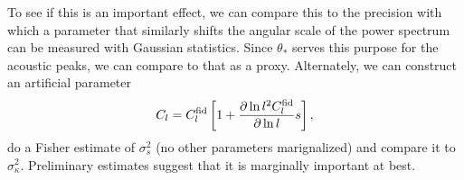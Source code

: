 \documentclass[11pt]{article}
\begin{document}
To see if this is an important effect, we can compare this to the precision with which a parameter
that similarly shifts the angular scale of the power spectrum can be measured with Gaussian statistics.   Since $\theta_*$ serves this purpose for the acoustic peaks, we can compare to that as a proxy.   Alternately, we 
can construct an artificial parameter 
\begin{equation}
C_l = C_l^{\rm fid} \left[ 1+ \frac{\partial \ln l^2 C_l^{\rm fid} }{\partial \ln l} s \right],
\end{equation}
do a Fisher estimate of $\sigma_s^2$ (no other parameters marignalized) and compare it to $\sigma_\kappa^2$.  Preliminary estimates suggest that it is marginally important at best.










 
\end{document}
